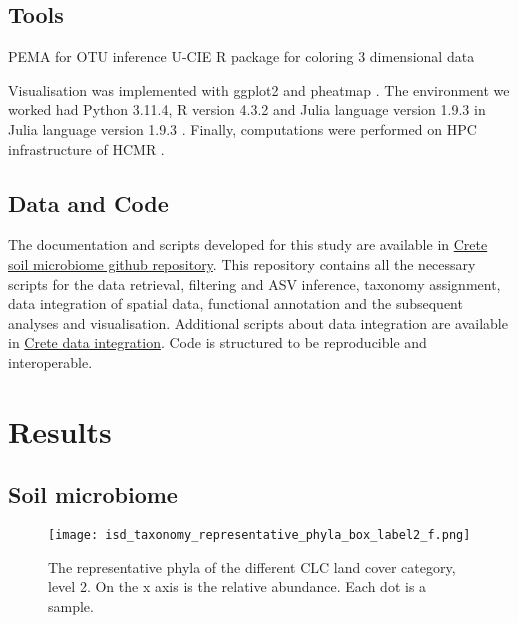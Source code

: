 \subsection{Tools}\label{Coding environment}
PEMA for OTU inference \parencite{zafeiropoulos2020pema}
U-CIE R package for coloring 3 dimensional data \parencite{Koutrouli2022}

Visualisation was implemented with ggplot2 \parencite{wickham_ggplot2_2016} and pheatmap \parencite{Kolde2019}.
The environment we worked had Python 3.11.4, R version 4.3.2 \parencite{rcoreteam}
and Julia language version 1.9.3 \parencite{Julia-2017}in Julia language version 1.9.3 \parencite{Julia-2017}.
Finally, computations were performed on HPC infrastructure of HCMR \parencite{zafeiropoulos_0s_2021}.

\subsection{Data and Code}
The documentation and scripts developed for this study are available in
\href{https://github.com/savvas-paragkamian/crete_soil_microbiome/}{Crete soil microbiome github repository}.
This repository contains all the necessary scripts for the data retrieval,
filtering and ASV inference, taxonomy assignment, data integration of spatial data, 
functional annotation and the subsequent analyses and visualisation.
Additional scripts about data integration are available in
\href{https://github.com/savvas-paragkamian/crete-data-integration}{Crete data integration}.
Code is structured to be reproducible and interoperable.

\section{Results}\label{integration_results}

\subsection{Soil microbiome}\label{soil_microbiome}

\begin{figure}[hbt!] 
    \centering\texttt{[image: isd\_taxonomy\_representative\_phyla\_box\_label2\_f.png]}
\caption{The representative phyla of the different CLC land cover category, level 2. On the x axis is the relative abundance. Each dot is a sample.}
    \label{fig:isd_representative_phyla_label2}
\end{figure}


